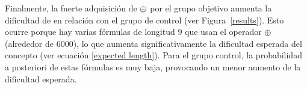 Finalmente, la fuerte adquisición de $ \oplus $ por el grupo objetivo aumenta la dificultad de \testb en relación con el grupo de control (ver Figura~\ref{results}). Esto ocurre porque hay varias fórmulas de longitud $9$ que usan el operador $ \oplus $ (alrededor de $6000$), lo que aumenta significativamente la dificultad esperada del concepto (ver ecuación \eqref{expected length}). Para el grupo control, la probabilidad a posteriori de estas fórmulas es muy baja, provocando un menor aumento de la dificultad esperada.


